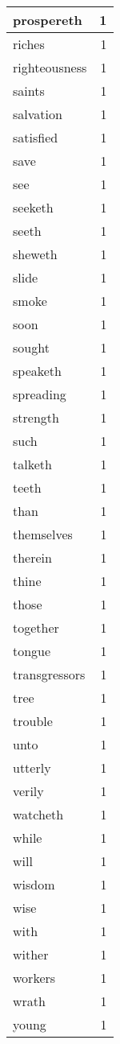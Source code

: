 \begin{center}
\begin{longtable}{l|r}
prospereth & 1 \\ \hline
riches & 1 \\ \hline
righteousness & 1 \\ \hline
saints & 1 \\ \hline
salvation & 1 \\ \hline
satisfied & 1 \\ \hline
save & 1 \\ \hline
see & 1 \\ \hline
seeketh & 1 \\ \hline
seeth & 1 \\ \hline
sheweth & 1 \\ \hline
slide & 1 \\ \hline
smoke & 1 \\ \hline
soon & 1 \\ \hline
sought & 1 \\ \hline
speaketh & 1 \\ \hline
spreading & 1 \\ \hline
strength & 1 \\ \hline
such & 1 \\ \hline
talketh & 1 \\ \hline
teeth & 1 \\ \hline
than & 1 \\ \hline
themselves & 1 \\ \hline
therein & 1 \\ \hline
thine & 1 \\ \hline
those & 1 \\ \hline
together & 1 \\ \hline
tongue & 1 \\ \hline
transgressors & 1 \\ \hline
tree & 1 \\ \hline
trouble & 1 \\ \hline
unto & 1 \\ \hline
utterly & 1 \\ \hline
verily & 1 \\ \hline
watcheth & 1 \\ \hline
while & 1 \\ \hline
will & 1 \\ \hline
wisdom & 1 \\ \hline
wise & 1 \\ \hline
with & 1 \\ \hline
wither & 1 \\ \hline
workers & 1 \\ \hline
wrath & 1 \\ \hline
young & 1 \\ \hline
\end{longtable}
\end{center}



\normalsize